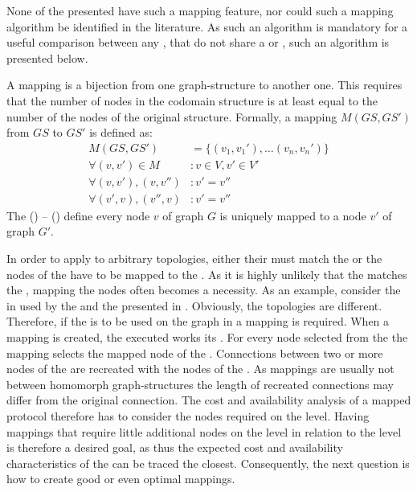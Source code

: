 \documentclass[conference]{IEEEtran}
\begin{document}
None of the presented  have such a mapping feature, nor could such a
mapping algorithm be identified in the literature.
As such an algorithm is mandatory for a useful comparison between any
, that do not share a  or , such an algorithm is
presented below.

A mapping is a bijection from one graph-structure to another one. 
This requires that the number of nodes in the codomain structure is at least
equal to the number of the nodes of the original structure.
Formally, a mapping \(M(GS,GS')\) from \(GS\) to \(GS'\) is defined as:
\begin{align}
M(GS,GS') &= \{ (v_1,v_1'), \dots (v_n,v_{n}') \} \label{eq:injection1} \\ 
\forall (v,v') \in M &: v \in V, v' \in V'\\
\forall (v,v'),(v,v'') &: v' = v''\\
\forall (v',v),(v'',v) &: v' = v'' \label{eq:injection2}
\end{align}
The () -- () define every
node \(v\) of graph \(G\) is uniquely mapped to a node \(v'\) of graph \(G'\). 

In order to apply  to arbitrary topologies, either
their  must match the  or the nodes of the  have to
be mapped to the .
As it is highly unlikely that the  matches the , mapping the
nodes often becomes a necessity.
As an example, consider the  in  used by the
 and the  presented in .
Obviously, the topologies are different.
Therefore, if the  is to be used on the graph in  a
mapping is required.
When a mapping is created, the executed  works its .
For every node selected from the  the mapping selects the mapped node
of the .
Connections between two or more nodes of the  are recreated with the
nodes of the .
As mappings are usually not between homomorph graph-structures the length of
recreated connections may differ from the original connection. 
The cost and availability analysis of a mapped protocol therefore has to
consider the nodes required on the  level.
Having mappings that require little additional nodes on the  level in
relation to the  level is therefore a desired goal, as thus the
expected cost and availability characteristics of the  can be traced
the closest.
Consequently, the next question is how to create good or even optimal
mappings.
\end{document}

